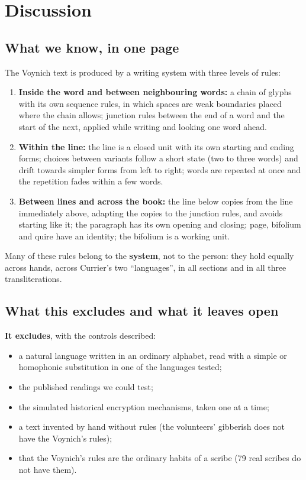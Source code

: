 \section{Discussion}

\subsection{What we know, in one page}

The Voynich text is produced by a writing system with three levels of rules:
\begin{enumerate}
\item \textbf{Inside the word and between neighbouring words:} a chain of glyphs with its own sequence rules, in which
  spaces are weak boundaries placed where the chain allows; junction rules between the end of a word and the start of the
  next, applied while writing and looking one word ahead.
\item \textbf{Within the line:} the line is a closed unit with its own starting and ending forms; choices between variants
  follow a short state (two to three words) and drift towards simpler forms from left to right; words are repeated at
  once and the repetition fades within a few words.
\item \textbf{Between lines and across the book:} the line below copies from the line immediately above, adapting the
  copies to the junction rules, and avoids starting like it; the paragraph has its own opening and closing; page,
  bifolium and quire have an identity; the bifolium is a working unit.
\end{enumerate}
Many of these rules belong to the \textbf{system}, not to the person: they hold equally across hands, across Currier's
two ``languages'', in all sections and in all three transliterations.

\subsection{What this excludes and what it leaves open}

\noindent\textbf{It excludes}, with the controls described:
\begin{itemize}
\item a natural language written in an ordinary alphabet, read with a simple or homophonic substitution in one of the
  languages tested;
\item the published readings we could test;
\item the simulated historical encryption mechanisms, taken one at a time;
\item a text invented by hand without rules (the volunteers' gibberish does not have the Voynich's rules);
\item that the Voynich's rules are the ordinary habits of a scribe (79 real scribes do not have them).
\end{itemize}

